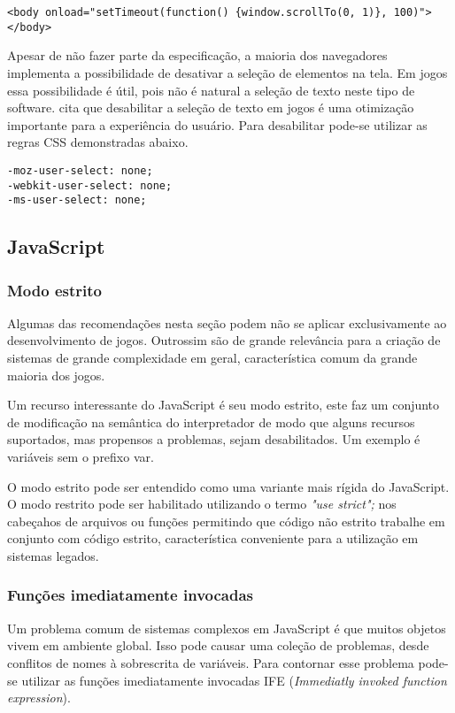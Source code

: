 \begin{draft}
\begin{verbatim}
<body onload="setTimeout(function() {window.scrollTo(0, 1)}, 100)">
</body>
\end{verbatim}

Apesar de não fazer parte da especificação, a maioria dos navegadores
implementa a possibilidade de desativar a seleção de elementos na tela.
Em jogos essa possibilidade é útil, pois não é natural a seleção de texto
neste tipo de software. \cite{html5mostwanted} cita que desabilitar
a seleção de texto em jogos é uma otimização importante para a
experiência do usuário. Para desabilitar pode-se utilizar as regras
CSS demonstradas abaixo.

\begin{verbatim}
-moz-user-select: none;
-webkit-user-select: none;
-ms-user-select: none;
\end{verbatim}

\subsection{JavaScript}
\subsubsection{Modo estrito}
Algumas das recomendações nesta seção podem não se aplicar
exclusivamente ao desenvolvimento de jogos. Outrossim são de grande
relevância para a criação de sistemas de grande complexidade em geral,
característica comum da grande maioria dos jogos.

Um recurso interessante do JavaScript é seu modo estrito, este faz
um conjunto de modificação na semântica do interpretador de modo
que alguns recursos suportados, mas propensos a problemas, sejam
desabilitados. Um exemplo é variáveis sem o prefixo var.

O modo estrito pode ser entendido como uma variante mais rígida
do JavaScript. O modo restrito pode ser habilitado utilizando o
termo \textit{"use strict";} nos cabeçahos de arquivos ou funções
permitindo que código não estrito trabalhe em conjunto com código
estrito, característica conveniente para a utilização em sistemas
legados.

\subsubsection{Funções imediatamente invocadas}

Um problema comum de sistemas complexos em JavaScript é que muitos
objetos vivem em ambiente global. Isso pode causar uma coleção de
problemas, desde conflitos de nomes à sobrescrita de variáveis. Para
contornar esse problema pode-se utilizar as funções imediatamente
invocadas IFE (\textit{Immediatly invoked function expression}).
\end{draft}

